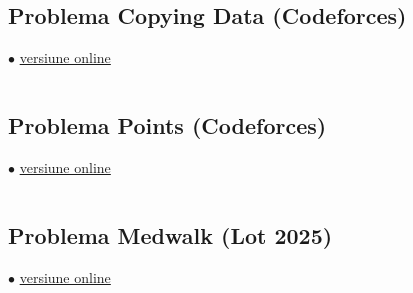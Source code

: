 \inputminted{cpp}{src/segment-trees/sereja-and-brackets.cpp}

\subsection{Problema Copying Data (Codeforces)}
\label{code:copying-data}
$\bullet$
\href{https://codeforces.com/contest/292/submission/281463235}{versiune online}

\inputminted{cpp}{src/segment-trees/copying-data.cpp}

\subsection{Problema Points (Codeforces)}
\label{code:points}
$\bullet$
\href{https://codeforces.com/contest/19/submission/281139891}{versiune online}

\inputminted{cpp}{src/segment-trees/points.cpp}

\subsection{Problema Medwalk (Lot  2025)}
\label{code:medwalk}
$\bullet$
\href{https://kilonova.ro/submissions/770116}{versiune online}

\inputminted{cpp}{src/segment-trees/medwalk.cpp}
